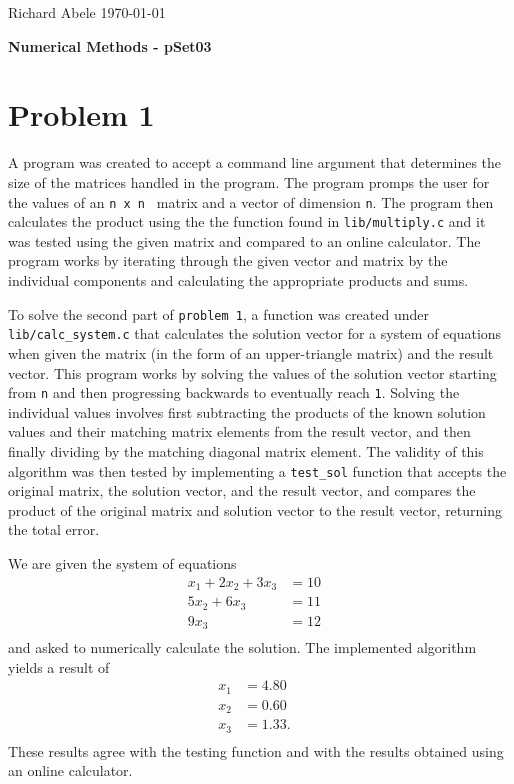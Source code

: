 \documentclass[12pt]{article}
\begin{document}
\noindent Richard Abele \hfill \today \\[30pt]
\centerline{ \Large{ \textbf{ Numerical Methods - pSet03 }}}

\section{Problem 1}
\label{sec:prob1}

A program was created to accept a command line argument that determines the size of the matrices handled in the program. The program promps the user for the values of an \texttt{n x n } matrix and a vector of dimension \texttt{n}. The program then calculates the product using the the function found in \texttt{lib/multiply.c} and it was tested using the given matrix and compared to an online calculator. The program works by iterating through the given vector and matrix by the individual components and calculating the appropriate products and sums. 

To solve the second part of \texttt{problem 1}, a function was created under \texttt{lib/calc_system.c} that calculates the solution vector for a system of equations when given the matrix (in the form of an upper-triangle matrix) and the result vector. This program works by solving the values of the solution vector starting from \texttt{n} and then progressing backwards to eventually reach \texttt{1}. Solving the individual values involves first subtracting the products of the known solution values and their matching matrix elements from the result vector, and then finally dividing by the matching diagonal matrix element. The validity of this algorithm was then tested by implementing a \texttt{test_sol} function that accepts the original matrix, the solution vector, and the result vector, and compares the product of the original matrix and solution vector to the result vector, returning the total error. 

We are given the system of equations
\begin{align*}
	x_{1} + 2 x_{2} + 3 x_{3} & =  10 &\\
	5 x_{2} + 6 x_{3} & =  11 &\\
	9 x_{3} & =  12 &\\
\end{align*}
and asked to numerically calculate the solution. The implemented algorithm yields a result of 
\begin{align*}
	x_{1} & =  4.80 &\\
	x_{2} & =  0.60 &\\
	x_{3} & =  1.33. &\\
\end{align*}
These results agree with the testing function and with the results obtained using an online calculator. 
\end{document}
